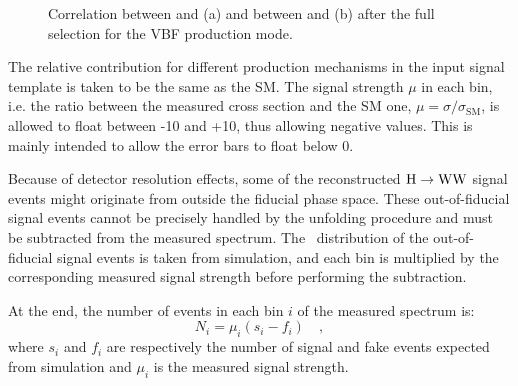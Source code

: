 \begin{figure}[htb]
\centering
{}
\caption{Correlation between \pth and \mll (a) and between \pth and \mt (b) after the full selection for the VBF production mode.\label{fig:correlation_vbf}}
\end{figure}

The relative contribution for different production mechanisms in the input signal template is taken to be the same as the SM.
The signal strength $\mu$ in each bin, i.e. the ratio between the measured cross section and the SM one, $\mu = \sigma/\sigma_\mathrm{SM}$, is allowed to float between -10 and +10, thus allowing negative values. This is mainly intended to allow the error bars to float below 0.

Because of detector resolution effects, some of the reconstructed ${\mathrm{H}\to\mathrm{WW}}$ signal events might originate from outside the fiducial phase space.  
These out-of-fiducial signal events cannot be precisely handled by the unfolding procedure and must be subtracted from the measured spectrum. The \pth~distribution of the out-of-fiducial signal events is taken from simulation, and each bin is multiplied by the corresponding measured signal strength before performing the subtraction. 

At the end, the number of events in each bin $i$ of the measured spectrum is:
\begin{equation}
N_i = \mu_i (s_i -f_i) \quad ,
\end{equation}
where $s_i$ and $f_i$ are respectively the number of signal and fake events expected from simulation and $\mu_i$ is the measured signal strength.

